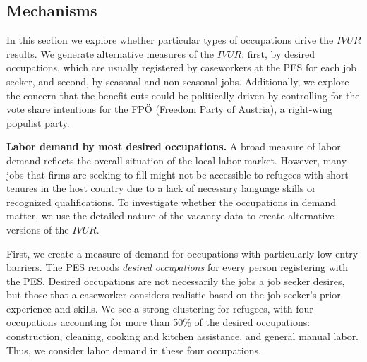\subsection{Mechanisms}\label{sec:mech}
In this section we explore whether particular types of occupations drive the $IVUR$ results. We generate alternative measures of the $IVUR$: first, by desired occupations, which are usually registered by caseworkers at the PES for each job seeker, and second, by seasonal and non-seasonal jobs.
Additionally, we explore the concern that the benefit cuts could be politically driven by controlling for the vote share intentions for the FPÖ (Freedom Party of Austria), a right-wing populist party.

\vspace{0.5cm}
\noindent\textbf{Labor demand by most desired occupations.}\hspace{0.5cm} A broad measure of labor demand reflects the overall situation of the local labor market. However, many jobs that firms are seeking to fill might not be accessible to refugees with short tenures in the host country due to a lack of necessary language skills or recognized qualifications. To investigate whether the occupations in demand matter, we use the detailed nature of the vacancy data to create alternative versions of the $IVUR$.

First, we create a measure of demand for occupations with particularly low entry barriers. The PES records \textit{desired occupations} for every person registering with the PES. Desired occupations are not necessarily the jobs a job seeker desires, but those that a caseworker considers realistic based on the job seeker’s prior experience and skills. We see a strong clustering for refugees, with four occupations accounting for more than 50\% of the desired occupations: construction, cleaning, cooking and kitchen assistance, and general manual labor. Thus, we consider labor demand in these four occupations.

